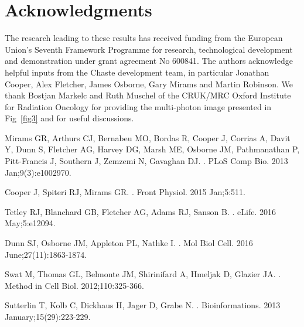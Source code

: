 \documentclass[10pt,letterpaper]{article}
\begin{document}
\section*{Acknowledgments}
The research leading to these results has received funding from the European Union's Seventh Framework Programme for research, technological development and demonstration under grant agreement No 600841. The authors acknowledge helpful inputs from the Chaste development team, in particular Jonathan Cooper, Alex Fletcher, James Osborne, Gary Mirams and Martin Robinson. We thank Bostjan Markelc and Ruth Muschel of the CRUK/MRC Oxford Institute for Radiation Oncology for providing the multi-photon image presented in Fig~\ref{fig3} and for useful discussions.

\nolinenumbers

\begin{thebibliography}{10}
Mirams GR, Arthurs CJ, Bernabeu MO, Bordas R, Cooper J, Corrias A, Davit Y, Dunn S, Fletcher AG, Harvey DG, Marsh ME, Osborne JM, Pathmanathan P, Pitt-Francis J, Southern J, Zemzemi N, Gavaghan DJ.
.
\newblock PLoS Comp Bio. 2013 Jan;9(3):e1002970.

Cooper J, Spiteri RJ, Mirams GR.
.
\newblock Front Physiol. 2015 Jan;5:511.

Tetley RJ, Blanchard GB, Fletcher AG, Adams RJ, Sanson B.
.
\newblock eLife. 2016 May;5:e12094.

Dunn SJ, Osborne JM, Appleton PL, Nathke I.
.
\newblock Mol Biol Cell. 2016 June;27(11):1863-1874.

Swat M, Thomas GL, Belmonte JM, Shirinifard A, Hmeljak D, Glazier JA.
.
\newblock Method in Cell Biol. 2012;110:325-366.

Sutterlin T, Kolb C, Dickhaus H, Jager D, Grabe N.
.
\newblock Bioinformations. 2013 January;15(29):223-229.


\end{thebibliography}
\end{document}
